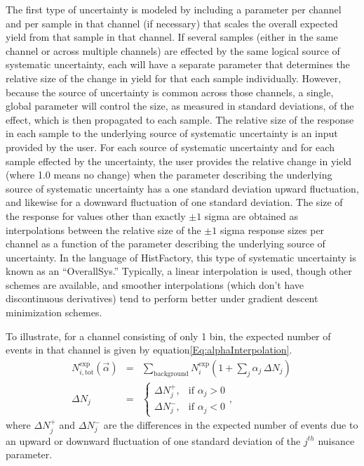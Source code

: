 The first type of uncertainty is modeled by including a parameter per channel and per sample in that channel (if necessary) that scales the overall expected yield from that sample in that channel.
If several samples (either in the same channel or across multiple channels) are effected by the same logical source of systematic uncertainty, each will have a separate parameter that determines the relative size of the change in yield for that each sample individually.
However, because the source of uncertainty is common across those channels, a single, global parameter will control the size, as measured in standard deviations, of the effect, which is then propagated to each sample.
The relative size of the response in each sample to the underlying source of systematic uncertainty is an input provided by the user.
For each source of systematic uncertainty and for each sample effected by the uncertainty, the user provides the relative change in yield (where 1.0 means no change) when the parameter describing the underlying source of systematic uncertainty has a one standard deviation upward fluctuation, and likewise for a downward fluctuation of one standard deviation.
The size of the response for values other than exactly $\pm 1$ sigma are obtained as interpolations between the relative size of the $\pm 1$ sigma response sizes per channel as a function of the parameter describing the underlying source of uncertainty.
In the language of HistFactory, this type of systematic uncertainty is known as an ``OverallSys.''
Typically, a linear interpolation is used, though other schemes are available, and smoother interpolations (which don't have discontinuous derivatives) tend to perform better under gradient descent minimization schemes.

To illustrate, for a channel consisting of only 1 bin, the expected number of events in that channel is given by equation\ref{Eq:alphaInterpolation}.
\begin{eqnarray}\label{Eq:alphaInterpolation}
N^{\text{exp}}_{i, \text{tot}}(\vec{\alpha}) &=& \sum_{\text{background}} N^{\text{exp}}_{i} (1 + \sum_{j} \alpha_{j} \, \Delta N_j  ) \, \\
\Delta N_j &=& \begin{cases} \Delta N^{+}_{j}, & \mbox{if } \alpha_{j} > 0  \\ \Delta N^{-}_{j}, & \mbox{if } \alpha_{j} < 0 \end{cases},
\end{eqnarray}
where $\Delta N^{+}_{j}$ and $\Delta N^{-}_{j}$ are the differences in the expected number of events due to an upward or downward fluctuation
of one standard deviation of the $j^{th}$ nuisance parameter.


